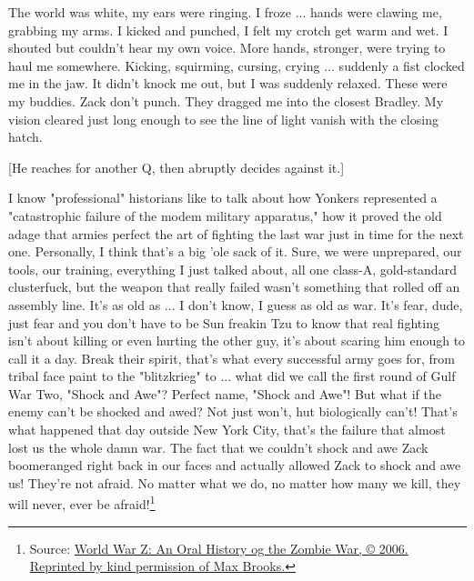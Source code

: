 \documentclass[10pt,a5paper,twoside]{book}
\newcommand{\source}[1]{\footnote{Source: \href{#1}{#1}}}
\begin{document}
The world was white, my ears were ringing. I froze ... hands were clawing me, grabbing my arms. I kicked and punched, I felt my crotch get warm and wet. I shouted but couldn't hear my own voice. More hands, stronger, were trying to haul me somewhere. Kicking, squirming, cursing, crying ... suddenly a fist clocked me in the jaw. It didn't knock me out, but I was suddenly relaxed. These were my buddies. Zack don't punch. They dragged me into the closest Bradley. My vision cleared just long enough to see the line of light vanish with the closing hatch.

[He reaches for another Q, then abruptly decides against it.]

I know "professional" historians like to talk about how Yonkers represented a "catastrophic failure of the modem military apparatus," how it proved the old adage that armies perfect the art of fighting the last war just in time for the next one. Personally, I think that's a big 'ole sack of it. Sure, we were unprepared, our tools, our training, everything I just talked about, all one class-A, gold-standard clusterfuck, but the weapon that really failed wasn't something that rolled off an assembly line. It's as old as ... I don't know, I guess as old as war. It's fear, dude, just fear and you don't have to be Sun freakin Tzu to know that real fighting isn't about killing or even hurting the other guy, it's about scaring him enough to call it a day. Break their spirit, that's what every successful army goes for, from tribal face paint to the "blitzkrieg" to ... what did we call the first round of Gulf War Two, "Shock and Awe"? Perfect name, "Shock and Awe"! But what if the enemy can't be shocked and awed? Not just won't, hut biologically can't! That's what happened that day outside New York City, that's the failure that almost lost us the whole damn war. The fact that we couldn't shock and awe Zack boomeranged right back in our faces and actually allowed Zack to shock and awe us! They're not afraid. No matter what we do, no matter how many we kill, they will never, ever be afraid!\source{World War Z: An Oral History og the Zombie War, © 2006. Reprinted by kind permission of Max Brooks.}{}
\end{document}
